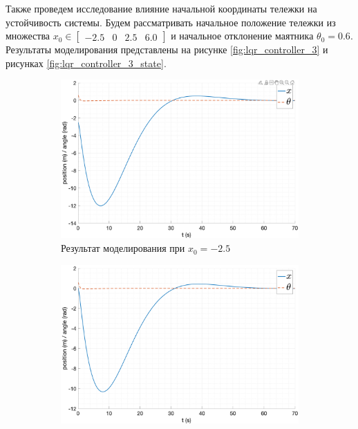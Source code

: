 Также проведем исследование влияние начальной координаты тележки на устойчивость системы. 
Будем рассматривать начальное положение тележки из множества $x_0 \in \begin{bmatrix}-2.5 & 0 & 2.5 & 6.0\end{bmatrix}$ 
и начальное отклонение маятника $\theta_0 = 0.6$.
Результаты моделирования представлены на рисунке \ref{fig:lqr_controller_3} и рисунках \ref{fig:lqr_controller_3_state}.
\begin{figure}[ht!]
    \centering
    \begin{subfigure}[b]{0.45\textwidth}
        \centering
        \includegraphics[width=\textwidth]{media/plots/LQR/out_6.png}
        \caption{Результат моделирования при $x_0 = -2.5$}
    \end{subfigure}
    \begin{subfigure}[b]{0.45\textwidth}        
        \centering
        \includegraphics[width=\textwidth]{media/plots/LQR/out_7.png}

\end{subfigure}
\end{figure}
